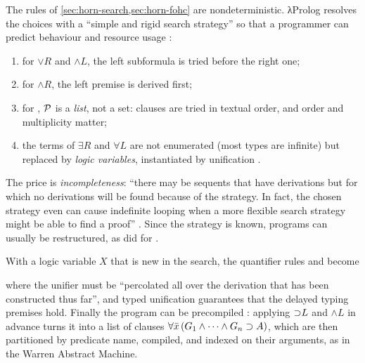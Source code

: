 The rules of \cref{sec:horn-search,sec:horn-fohc} are nondeterministic. λProlog resolves the choices with
a ``simple and rigid search strategy'' so that a programmer can predict behaviour and resource usage
:
\begin{enumerate}
  \item for $\vee R$ and $\wedge L$, the left subformula is tried before the right one;
  \item for $\wedge R$, the left premise is derived first;
  \item for , $\mathcal{P}$ is a \emph{list}, not a set: clauses are tried in textual order, and
    order and multiplicity matter;
  \item the terms of $\exists R$ and $\forall L$ are not enumerated (most types are infinite) but replaced
    by \emph{logic variables}, instantiated by unification .
\end{enumerate}
The price is \emph{incompleteness}: ``there may be sequents that have derivations but for which no
derivations will be found because of the strategy. In fact, the chosen strategy even can cause indefinite
looping when a more flexible search strategy might be able to find a proof'' . Since the strategy
is known, programs can usually be restructured, as  did for .

With a logic variable $X$ that is new in the search, the quantifier rules and  become
where the unifier must be ``percolated all over the derivation that has been constructed thus far'', and
typed unification guarantees that the delayed typing premises hold. Finally the program can be precompiled
: applying ${\supset}L$ and $\wedge L$ in advance turns it into a list of clauses
$\forall\bar x\,(G_1\wedge\cdots\wedge G_n\supset A)$, which are then partitioned by predicate name, compiled,
and indexed on their arguments, as in the Warren Abstract Machine.

